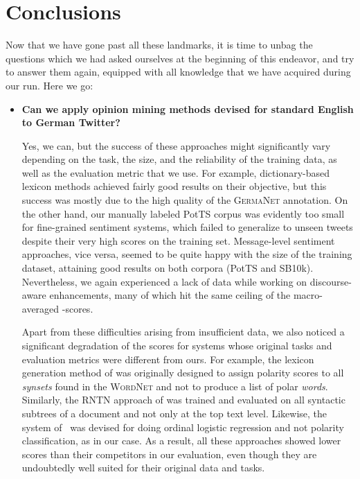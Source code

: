 \section*{Conclusions}

Now that we have gone past all these landmarks, it is time to unbag
the questions which we had asked ourselves at the beginning of this
endeavor, and try to answer them again, equipped with all knowledge
that we have acquired during our run.  Here we go:

\begin{itemize}
  \item\textbf{Can we apply opinion mining methods devised for
    standard English to German Twitter?}

    Yes, we can, but the success of these approaches might
    significantly vary depending on the task, the size, and the
    reliability of the training data, as well as the evaluation metric
    that we use. For example, dictionary-based lexicon methods
    achieved fairly good results on their objective, but this success
    was mostly due to the high quality of the \textsc{GermaNet}
    annotation.  On the other hand, our manually labeled PotTS corpus
    was evidently too small for fine-grained sentiment systems, which
    failed to generalize to unseen tweets despite their very high
    scores on the training set.  Message-level sentiment approaches,
    vice versa, seemed to be quite happy with the size of the training
    dataset, attaining good results on both corpora (PotTS and SB10k).
    Nevertheless, we again experienced a lack of data while working on
    discourse-aware enhancements, many of which hit the same ceiling
    of the macro-averaged \F{}-scores.

    Apart from these difficulties arising from insufficient data, we
    also noticed a significant degradation of the scores for systems
    whose original tasks and evaluation metrics were different from
    ours.  For example, the lexicon generation method of
    \citet{Esuli:05} was originally designed to assign polarity scores
    to all \emph{synsets} found in the \textsc{WordNet} and not to
    produce a list of polar \emph{words}.  Similarly, the RNTN
    approach of \citet{Socher:13} was trained and evaluated on all
    syntactic subtrees of a document and not only at the top text
    level.  Likewise, the system of~\citet{Yessenalina:11} was devised
    for doing ordinal logistic regression and not polarity
    classification, as in our case.  As a result, all these approaches
    showed lower scores than their competitors in our evaluation, even
    though they are undoubtedly well suited for their original data
    and tasks.


\end{itemize}
